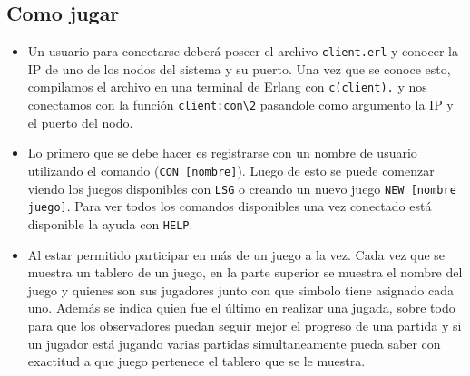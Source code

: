 \documentclass[a4paper]{article}
\newcommand{\blacktr}[0]{\item[$\blacktriangleright$]}
\begin{document}
\subsection*{Como jugar}
\begin{itemize}
   \blacktr Un usuario para conectarse deberá poseer el archivo \texttt{client.erl} y conocer la IP de uno de los nodos del sistema y su puerto. Una vez que se conoce esto, compilamos el archivo en una terminal de Erlang con \texttt{c(client).} y nos conectamos con la función \texttt{client:con\textbackslash2} pasandole como argumento la IP y el puerto del nodo. 
  
  \blacktr Lo primero que se debe hacer es registrarse con un nombre de usuario utilizando el comando (\texttt{CON [nombre]}). Luego de esto se puede comenzar viendo los juegos disponibles con \texttt{LSG} o creando un nuevo juego \texttt{NEW [nombre juego]}. Para ver todos los comandos disponibles una vez conectado está disponible la ayuda con \texttt{HELP}.

  \blacktr Al estar permitido participar en más de un juego a la vez. Cada vez que se muestra un tablero de un juego, en la parte superior se muestra el nombre del juego y quienes son sus jugadores junto con que simbolo tiene asignado cada uno. Además se indica quien fue el último en realizar una jugada, sobre todo para que los observadores puedan seguir mejor el progreso de una partida y si un jugador está jugando varias partidas simultaneamente pueda saber con exactitud a que juego pertenece el tablero que se le muestra.
\end{itemize}
\end{document}
